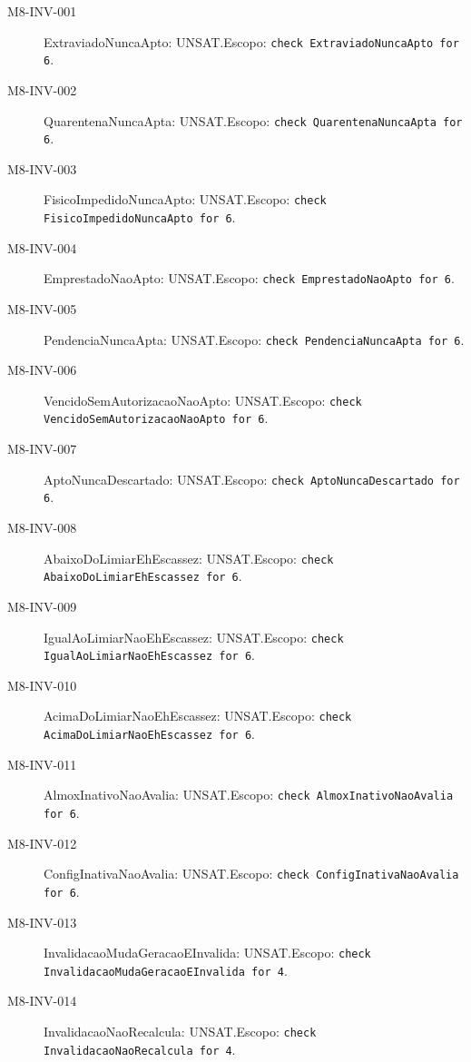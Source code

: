 \begin{description}
\item[M8-INV-001] ExtraviadoNuncaApto: UNSAT.\newline Escopo: \texttt{check ExtraviadoNuncaApto for 6}.
\item[M8-INV-002] QuarentenaNuncaApta: UNSAT.\newline Escopo: \texttt{check QuarentenaNuncaApta for 6}.
\item[M8-INV-003] FisicoImpedidoNuncaApto: UNSAT.\newline Escopo: \texttt{check FisicoImpedidoNuncaApto for 6}.
\item[M8-INV-004] EmprestadoNaoApto: UNSAT.\newline Escopo: \texttt{check EmprestadoNaoApto for 6}.
\item[M8-INV-005] PendenciaNuncaApta: UNSAT.\newline Escopo: \texttt{check PendenciaNuncaApta for 6}.
\item[M8-INV-006] VencidoSemAutorizacaoNaoApto: UNSAT.\newline Escopo: \texttt{check VencidoSemAutorizacaoNaoApto for 6}.
\item[M8-INV-007] AptoNuncaDescartado: UNSAT.\newline Escopo: \texttt{check AptoNuncaDescartado for 6}.
\item[M8-INV-008] AbaixoDoLimiarEhEscassez: UNSAT.\newline Escopo: \texttt{check AbaixoDoLimiarEhEscassez for 6}.
\item[M8-INV-009] IgualAoLimiarNaoEhEscassez: UNSAT.\newline Escopo: \texttt{check IgualAoLimiarNaoEhEscassez for 6}.
\item[M8-INV-010] AcimaDoLimiarNaoEhEscassez: UNSAT.\newline Escopo: \texttt{check AcimaDoLimiarNaoEhEscassez for 6}.
\item[M8-INV-011] AlmoxInativoNaoAvalia: UNSAT.\newline Escopo: \texttt{check AlmoxInativoNaoAvalia for 6}.
\item[M8-INV-012] ConfigInativaNaoAvalia: UNSAT.\newline Escopo: \texttt{check ConfigInativaNaoAvalia for 6}.
\item[M8-INV-013] InvalidacaoMudaGeracaoEInvalida: UNSAT.\newline Escopo: \texttt{check InvalidacaoMudaGeracaoEInvalida for 4}.
\item[M8-INV-014] InvalidacaoNaoRecalcula: UNSAT.\newline Escopo: \texttt{check InvalidacaoNaoRecalcula for 4}.

\end{description}
